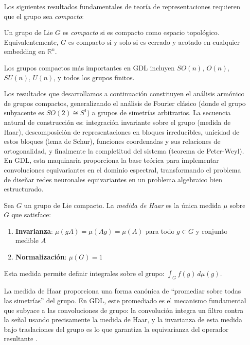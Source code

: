 Los siguientes resultados fundamentales de teoría de representaciones requieren que el grupo sea \textit{compacto}:

\begin{definition}\label{def:grupo_compacto}
Un grupo de Lie $G$ es \textit{compacto} si es compacto como espacio topológico. Equivalentemente, $G$ es compacto si y solo si es cerrado y acotado en cualquier embedding en $\mathbb{R}^n$.
\end{definition}

Los grupos compactos más importantes en \gls{GDL} incluyen $SO(n)$, $O(n)$, $SU(n)$, $U(n)$, y todos los grupos finitos.

Los resultados que desarrollamos a continuación constituyen el análisis armónico de grupos compactos, generalizando el análisis de Fourier clásico (donde el grupo subyacente es $SO(2) \cong S^1$) a grupos de simetrías arbitrarios. La secuencia natural de construcción es: integración invariante sobre el grupo (medida de Haar), descomposición de representaciones en bloques irreducibles, unicidad de estos bloques (lema de Schur), funciones coordenadas y sus relaciones de ortogonalidad, y finalmente la completitud del sistema (teorema de Peter-Weyl). En \gls{GDL}, esta maquinaria proporciona la base teórica para implementar convoluciones equivariantes en el dominio espectral, transformando el problema de diseñar redes neuronales equivariantes en un problema algebraico bien estructurado.

\begin{definition}\label{def:medida_haar_gdl}
Sea $G$ un grupo de Lie compacto. La \textit{medida de Haar} es la única medida $\mu$ sobre $G$ que satisface:
\begin{enumerate}
    \item \textbf{Invarianza}: $\mu(gA) = \mu(Ag) = \mu(A)$ para todo $g \in G$ y conjunto medible $A$
    \item \textbf{Normalización}: $\mu(G) = 1$
\end{enumerate}
Esta medida permite definir integrales sobre el grupo: $\int_G f(g) \, d\mu(g)$.
\end{definition}

La medida de Haar proporciona una forma canónica de ``promediar sobre todas las simetrías'' del grupo. En \gls{GDL}, este promediado es el mecanismo fundamental que subyace a las convoluciones de grupo: la convolución integra un filtro contra la señal usando precisamente la medida de Haar, y la invarianza de esta medida bajo traslaciones del grupo es lo que garantiza la equivarianza del operador resultante \citep{cohen2016groupequivariantconvolutional, kondor2018generalizationconvolutionalneural}.

